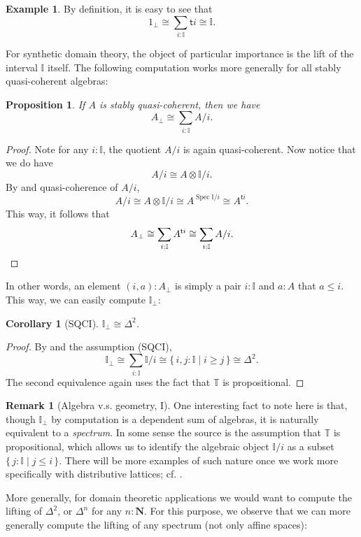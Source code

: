 \documentclass[12pt]{amsart}
\newtheorem{corollary}[theorem]{Corollary}
\newtheorem{proposition}[theorem]{Proposition}
\theoremstyle{definition}
\newtheorem{example}[theorem]{Example}
\newtheorem{remark}[theorem]{Remark}
\newcommand{\mb}[1]{\mathbf{#1}}
\newcommand{\mbb}[1]{\mathbb{#1}}
\newcommand{\T}{\mbb T}
\newcommand{\I}{\mbb I}
\newcommand{\ms}[1]{\mathsf{#1}}
\newcommand{\scomp}[2]{\{\,#1\mid#2\,\}}
\newcommand{\N}{\mb N}
\newcommand{\prt}{_{\bot}}
\newcommand{\spec}{\operatorname{Spec}}
\begin{document}
\begin{example}
  By definition, it is easy to see that
  \[ 1\prt \cong \sum_{i:\I}\ms ti \cong \I. \]
\end{example}

For synthetic domain theory, the object of particular importance is the lift of the interval $\I$ itself. The following computation works more generally for all stably quasi-coherent algebras:

\begin{proposition}\label{prop:liftingofalgebra}
  If $A$ is stably quasi-coherent, then we have
  \[ A\prt \cong \sum_{i:\I}A/i. \]
\end{proposition}
\begin{proof}
  Note for any $i : \I$, the quotient $A/i$ is again quasi-coherent. Now notice that we do have
  \[ A/i \cong A \otimes \I/i. \]
  By  and quasi-coherence of $A/i$, 
  \[ A/i \cong A \otimes \I/i \cong A^{\spec \I/i} \cong A^{\ms ti}. \]
  This way, it follows that 
  \[ A\prt \cong \sum_{i:\I}A^{\ms ti} \cong \sum_{i:\I}A/i. \qedhere \]
\end{proof}

In other words, an element $(i,a) : A\prt$ is simply a pair $i : \I$ and $a : A$ that $a \le i$. This way, we can easily compute $\I\prt$:

\begin{corollary}[SQCI]
  $\I\prt \cong \Delta^2$.
\end{corollary}
\begin{proof}
  By  and the assumption (SQCI),
  \[ \I\prt \cong \sum_{i:\I}\I/i \cong \scomp{i,j : \I}{i \ge j} \cong \Delta^2. \]
  The second equivalence again uses the fact that $\T$ is propositional.
\end{proof}

\begin{remark}[Algebra v.s. geometry, I]
  One interesting fact to note here is that, though $\I\prt$ by computation is a dependent sum of algebras, it is naturally equivalent to a \emph{spectrum}. In some sense the source is the assumption that $\T$ is propositional, which allows us to identify the algebraic object $\I/i$ as a subset $\scomp{j : \I}{j \le i}$. There will be more examples of such nature once we work more specifically with distributive lattices; cf. .
\end{remark}

More generally, for domain theoretic applications we would want to compute the lifting of $\Delta^2$, or $\Delta^n$ for any $n:\N$. For this purpose, we observe that we can more generally compute the lifting of any spectrum (not only affine spaces):
\end{document}

